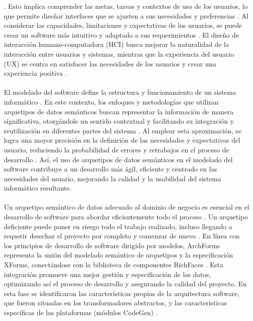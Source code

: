 \documentclass[12pt,a4paper]{article}
\begin{document}
\cite{Barbieri2013}
\cite{Martins1990}
\cite{Kopanitsa2015}
. Esto implica comprender las metas, tareas y contextos de uso de los usuarios, lo que permite diseñar interfaces que se ajusten a sus necesidades y preferencias
\cite{Gadea2016}
\cite{Pozdniakova2017}
. Al considerar las capacidades, limitaciones y expectativas de los usuarios, se puede crear un software más intuitivo y adaptado a sus requerimientos
\cite{Kopanitsa2015}
\cite{Hassan2017}
. El diseño de interacción humano-computadora (HCI) busca mejorar la naturalidad de la interacción entre usuarios y sistemas, mientras que la experiencia del usuario (UX) se centra en satisfacer las necesidades de los usuarios y crear una experiencia positiva
\cite{Qanbari2016}
\cite{Feras2022}
. 
\\\\
El modelado del software define la estructura y funcionamiento de un sistema informático
\cite{Hassan2016}
\cite{Gadea2016}
. En este contexto, los enfoques y metodologías que utilizan arquetipos de datos semánticos buscan representar la información de manera significativa, otorgándole un sentido contextual y facilitando su integración y reutilización en diferentes partes del sistema
\cite{Ward1987}
\cite{Duftschmid2010}
. Al emplear esta aproximación, se logra una mayor precisión en la definición de las necesidades y expectativas del usuario, reduciendo la probabilidad de errores y retrabajos en el proceso de desarrollo
\cite{Allones2013}
\cite{Mørup2012}
. Así, el uso de arquetipos de datos semánticos en el modelado del software contribuye a un desarrollo más ágil, eficiente y centrado en las necesidades del usuario, mejorando la calidad y la usabilidad del sistema informático resultante.
\\\\
Un arquetipo semántico de datos adecuado al dominio de negocio es esencial en el desarrollo de software para abordar eficientemente todo el proceso
\cite{Govinda2015}
\cite{Gouvas2016}
. Un arquetipo deficiente puede poner en riesgo todo el trabajo realizado, incluso llegando a requerir desechar el proyecto por completo y comenzar de nuevo
\cite{Duftschmid2010}
\cite{Cosenz2017}
. En línea con los principios de desarrollo de software dirigido por modelos, ArchForms representa la unión del modelado semántico de arquetipos y la especificación XForms, conectándose con la biblioteca de componentes RichFaces
\cite{Guo2015}
\cite{Batini1992}
. Esta integración promueve una mejor gestión y especificación de los datos, optimizando así el proceso de desarrollo y asegurando la calidad del proyecto. En esta fase se identificaron las características propias de la arquitectura software, que fueron situadas en los transformadores abstractos, y las características específicas de las plataformas (módulos CodeGen)
\cite{Stacey2017}
\cite{Upadhyay2023}
. 
\end{document}
